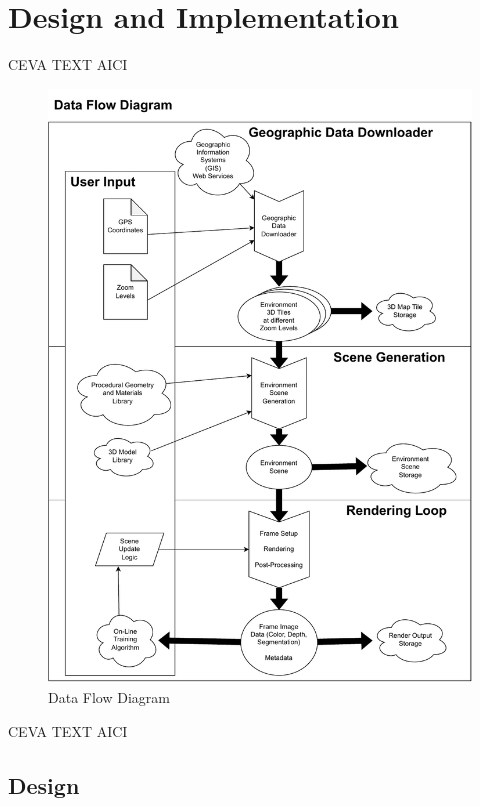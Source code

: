 \chapter{Design and Implementation}
\label{chapter:design-implementation}



CEVA TEXT AICI

\begin{figure}[H]
    \centering
    \includegraphics[width=14.5cm]{src/img/fig/fig-1-overview-v2.drawio-1.pdf}
    \caption{Data Flow Diagram}
    \label{fig:design-overview}
\end{figure}


CEVA TEXT AICI

\section{Design}
\label{sec:design}


